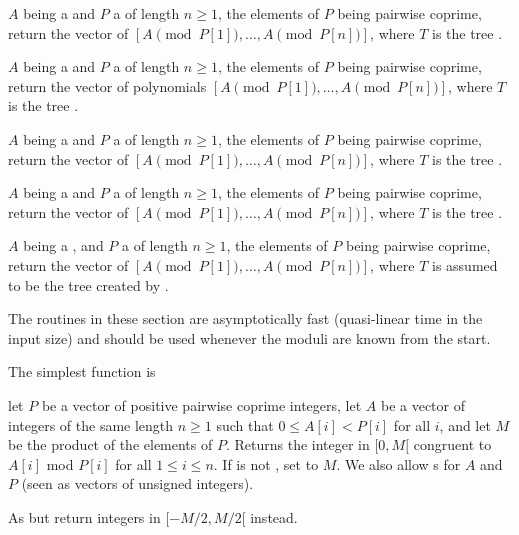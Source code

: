  $A$ being a 
and $P$ a  of length $n\ge 1$, the elements of $P$ being
pairwise coprime, return the vector of 
$[A \pmod{P[1]},\ldots,A \pmod{P[n]}]$,
where $T$ is the tree .

 $A$ being a 
and $P$ a  of length $n\ge 1$, the elements of $P$ being
pairwise coprime, return the vector of  polynomials
$[A \pmod{P[1]},\ldots,A \pmod{P[n]}]$,
where $T$ is the tree .

 $A$ being a 
and $P$ a  of length $n\ge 1$, the elements of $P$ being
pairwise coprime, return the vector of 
$[A \pmod{P[1]},\ldots,A \pmod{P[n]}]$,
where $T$ is the tree .

 $A$ being a 
and $P$ a  of length $n\ge 1$, the elements of $P$ being
pairwise coprime, return the vector of 
$[A \pmod{P[1]},\ldots,A \pmod{P[n]}]$,
where $T$ is the tree .

 $A$ being a ,
and $P$ a  of length $n\ge 1$, the elements of $P$ being
pairwise coprime, return the vector of 
$[A \pmod{P[1]},\ldots,A \pmod{P[n]}]$,
where $T$ is assumed to be the tree created by .

\medskip

The routines in these section are asymptotically fast (quasi-linear time in
the input size) and should be used whenever the moduli are known from
the start.

The simplest function is

let $P$ be a vector of positive pairwise coprime integers, let $A$ be a
vector of integers of the same length $n\ge 1$ such that $0 \leq A[i] < P[i]$
for all $i$, and let $M$ be the product of the elements of $P$. Returns the
integer in $[0, M[$ congruent to $A[i]$ mod $P[i]$ for all $1\leq i\leq n$.
If  is not , set  to $M$. We also allow
s for $A$ and $P$ (seen as vectors of unsigned integers).

As  but return integers in $[-M/2, M/2[$ instead.

